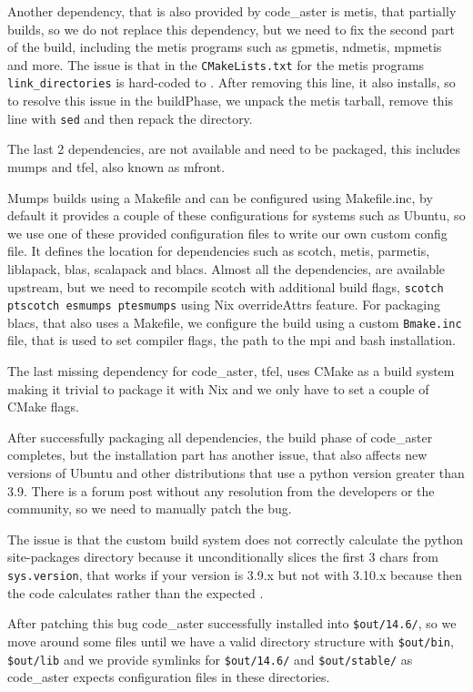 \documentclass{eceasst}
\begin{document}
Another dependency, that is also provided by code\_aster is metis, that partially builds, so we do not replace this dependency, but we need to fix the second part of the build, including the metis programs such as gpmetis, ndmetis, mpmetis and more.
The issue is that in the \texttt{CMakeLists.txt} for the metis programs \texttt{link\_directories} is hard-coded to .
After removing this line, it also installs, so to resolve this issue in the buildPhase, we unpack the metis tarball, remove this line with \texttt{sed} and then repack the directory.

The last 2 dependencies, are not available and need to be packaged, this includes mumps and tfel, also known as mfront.

Mumps builds using a Makefile and can be configured using Makefile.inc, by default it provides a couple of these configurations for systems such as Ubuntu, so we use one of these provided configuration files to write our own custom config file.
It defines the location for dependencies such as scotch, metis, parmetis, liblapack, blas, scalapack and blacs.
Almost all the dependencies, are available upstream, but we need to recompile scotch with additional build flags, \texttt{scotch ptscotch esmumps ptesmumps} using Nix overrideAttrs feature.
For packaging blacs, that also uses a Makefile, we configure the build using a custom \texttt{Bmake.inc} file, that is used to set compiler flags, the path to the mpi and bash installation.

The last missing dependency for code\_aster, tfel, uses CMake as a build system making it trivial to package it with Nix and we only have to set a couple of CMake flags.

After successfully packaging all dependencies, the build phase of code\_aster completes, but the installation part has another issue, that also affects new versions of Ubuntu and other distributions that use a python version greater than 3.9.
There is a forum post without any resolution from the developers or the community, so we need to manually patch the bug.

The issue is that the custom build system does not correctly calculate the python site-packages directory because it unconditionally slices the first 3 chars from \texttt{sys.version}, that works if your version is 3.9.x but not with 3.10.x because then the code calculates  rather than the expected .

After patching this bug code\_aster successfully installed into \texttt{\$out/14.6/}, so we move around some files until we have a valid directory structure with \texttt{\$out/bin}, \texttt{\$out/lib} and we provide symlinks for \texttt{\$out/14.6/} and \texttt{\$out/stable/} as code\_aster expects configuration files in these directories.
\end{document}
